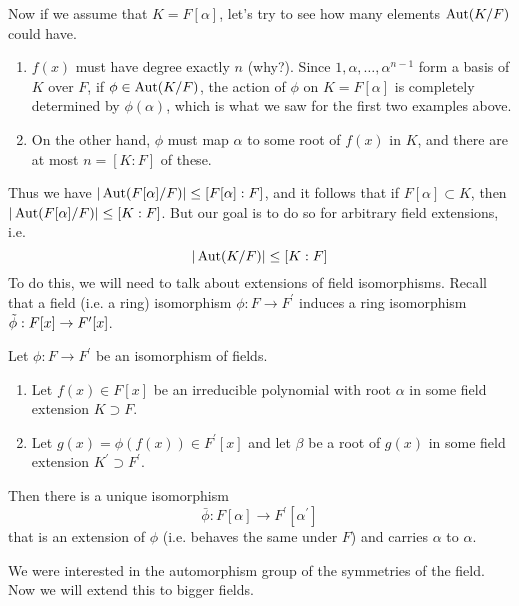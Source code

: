   Now if we assume that $K = F[\alpha]$, let's try to see how many elements $\Aut(K/F)$ could have. 
  \begin{enumerate}
    \item $f(x)$ must have degree exactly $n$ (why?). Since $1, \alpha, \ldots, \alpha^{n-1}$ form a basis of $K$ over $F$, if $\phi \in \Aut(K/F)$, the action of $\phi$ on $K = F[\alpha]$ is completely determined by $\phi(\alpha)$, which is what we saw for the first two examples above. 
    \item On the other hand, $\phi$ must map $\alpha$ to some root of $f(x)$ in $K$, and there are at most $n = [K:F]$ of these. 
  \end{enumerate}
  Thus we have $|\Aut(F[\alpha]/F)| \leq [F[\alpha]:F]$, and it follows that if $F[\alpha] \subset K$, then $|\Aut(F[\alpha]/F)| \leq [K:F]$. But our goal is to do so for arbitrary field extensions, i.e. 
  \begin{equation}
    |\Aut(K/F)| \leq [K:F]
  \end{equation} 
  To do this, we will need to talk about extensions of field isomorphisms. Recall that a field (i.e. a ring) isomorphism $\phi: F \to F^\prime$ induces a ring isomorphism $\Tilde{\phi}: F[x] \to F^\prime [x]$. 


  \begin{theorem}
    Let $\phi: F \to F^\prime$ be an isomorphism of fields.
    \begin{enumerate}
      \item Let $f(x) \in F[x]$ be an irreducible polynomial with root $\alpha$ in some field extension $K \supset F$.
      \item Let $g(x) = \phi(f(x)) \in F^\prime[x]$ and let $\beta$ be a root of $g(x)$ in some field extension $K^\prime \supset F^\prime$. 
    \end{enumerate}
    Then there is a unique isomorphism  
    \begin{equation}
      \bar{\phi} : F[\alpha] \to F^\prime [\alpha^\prime]
    \end{equation}
    that is an extension of $\phi$ (i.e. behaves the same under $F$) and carries $\alpha$ to $\alpha$. 
  \end{theorem}

  We were interested in the automorphism group of the symmetries of the field. Now we will extend this to bigger fields. 

